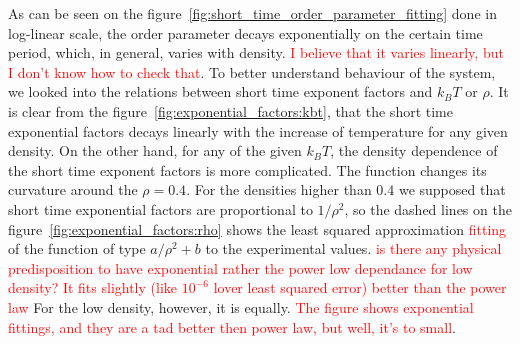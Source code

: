 As can be seen on the figure~\ref{fig:short_time_order_parameter_fitting} done in log-linear scale, the order parameter decays exponentially on the certain time period, which, in general, varies with density. \textcolor{red}{I believe that it varies linearly, but I don't know how to check that}. To better understand behaviour  of the system, we looked into the relations between short time exponent factors and $k_BT$ or $\rho$. It is clear from the figure~\ref{fig:exponential_factors:kbt}, that the short time exponential factors decays linearly with the increase of temperature for any given density. On the other hand, for any of the given $k_BT$, the density dependence of the short time exponent factors is more complicated. The function changes its curvature around the $\rho = 0.4$. For the densities higher than $0.4$ we supposed that short time exponential factors are proportional to $1/\rho^2$, so the dashed lines on the figure~\ref{fig:exponential_factors:rho} shows the least squared approximation \textcolor{red}{fitting} of the function of type $a/\rho^2 + b$ to the experimental values. \textcolor{red}{is there any physical predisposition to have exponential rather the power low dependance for low density? It fits slightly (like $10^{-6}$ lover least squared error) better than the power law} For the low density, however, it is equally. \textcolor{red}{The figure shows exponential fittings, and they are a tad better then power law, but well, it's to small}.

